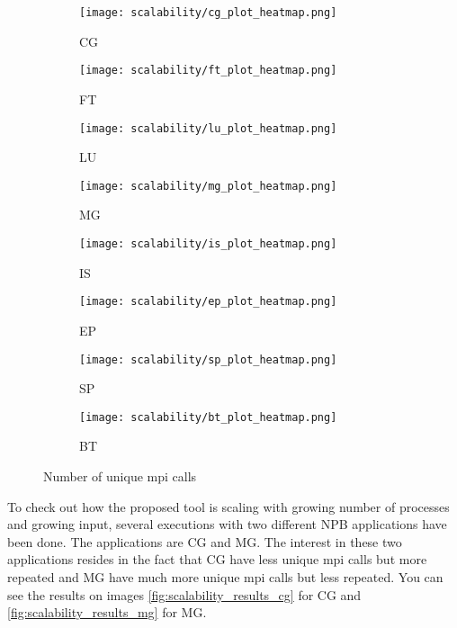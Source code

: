 \begin{figure}
    \centering
    \begin{subfigure}[b]{0.3\textwidth}
        \texttt{[image: scalability/cg\_plot\_heatmap.png]}
        \caption{CG}
        \label{fig:cg_sca}
    \end{subfigure}
    \quad
    \begin{subfigure}[b]{0.3\textwidth}
        \texttt{[image: scalability/ft\_plot\_heatmap.png]}
        \caption{FT}
        \label{fig:ft_sca}
    \end{subfigure}
    \quad   
    \begin{subfigure}[b]{0.3\textwidth}
        \texttt{[image: scalability/lu\_plot\_heatmap.png]}
        \caption{LU}
        \label{fig:lu_sca}
    \end{subfigure}
    
    \begin{subfigure}[b]{0.3\textwidth}
        \texttt{[image: scalability/mg\_plot\_heatmap.png]}
        \caption{MG}
        \label{fig:mg_sca}
    \end{subfigure}
    \quad
    \begin{subfigure}[b]{0.3\textwidth}
        \texttt{[image: scalability/is\_plot\_heatmap.png]}
        \caption{IS}
        \label{fig:is_sca}
    \end{subfigure}
    \quad
    \begin{subfigure}[b]{0.3\textwidth}
        \texttt{[image: scalability/ep\_plot\_heatmap.png]}
        \caption{EP}
        \label{fig:ep_sca}
    \end{subfigure}
    
    \begin{subfigure}[b]{0.3\textwidth}
        \texttt{[image: scalability/sp\_plot\_heatmap.png]}
        \caption{SP}
        \label{fig:sp_sca}
    \end{subfigure}
    \quad
    \begin{subfigure}[b]{0.3\textwidth}
        \texttt{[image: scalability/bt\_plot\_heatmap.png]}
        \caption{BT}
        \label{fig:bt_sca}
    \end{subfigure}
    \quad
    \caption{Number of unique mpi calls}
    \label{fig:scalability_results}
\end{figure}

To check out how the proposed tool is scaling with growing number of processes
and growing input, several executions with two different NPB applications have
been done. The applications are CG and MG. The interest in these two
applications resides in the fact that CG have less unique mpi calls but more
repeated and MG have much more unique mpi calls but less repeated. You can see 
the results on images \ref{fig:scalability_results_cg} for CG and 
\ref{fig:scalability_results_mg} for MG. 

